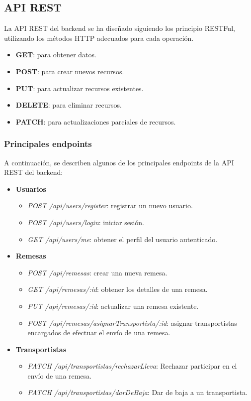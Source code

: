 \subsection{API REST}
La API REST del backend se ha diseñado siguiendo los principio RESTFul, utilizando los métodos HTTP adecuados para cada operación.
\begin{itemize}
\item \textbf{GET}: para obtener datos.
\item \textbf{POST}: para crear nuevos recursos.
\item \textbf{PUT}: para actualizar recursos existentes.
\item \textbf{DELETE}: para eliminar recursos.
\item \textbf{PATCH}: para actualizaciones parciales de recursos.
\end{itemize}

\subsubsection{Principales endpoints}
A continuación, se describen algunos de los principales endpoints de la API REST del backend:
\begin{itemize}
    \item \textbf{Usuarios}
    \begin{itemize}
        \item \textit{POST /api/users/register}: registrar un nuevo usuario.
        \item \textit{POST /api/users/login}: iniciar sesión.
        \item \textit{GET /api/users/me}: obtener el perfil del usuario autenticado.
    \end{itemize}
    \item \textbf{Remesas}
    \begin{itemize}
        \item \textit{POST /api/remesas}: crear una nueva remesa.
        \item \textit{GET /api/remesas/:id}: obtener los detalles de una remesa.
        \item \textit{PUT /api/remesas/:id}: actualizar una remesa existente.
        \item \textit{POST /api/remesas/asignarTransportista/:id}: asignar transportistas
         encargados de efectuar el envío de una remesa.
    \end{itemize}
    \item \textbf{Transportistas}
    \begin{itemize}
        \item \textit{PATCH /api/transportistas/rechazarLleva}: Rechazar participar en el envío de una remesa.
        \item \textit{PATCH /api/transportistas/darDeBaja}: Dar de baja a un transportista.
    \end{itemize}
\end{itemize}

